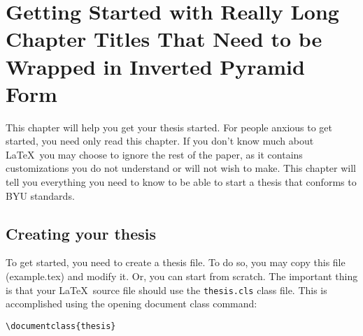 \documentclass[12pt]{thesis}
\begin{document}

% 

\tableofcontents
\listoftables
\listoffigures

\mainmatter

\chapter{Getting Started with Really Long Chapter Titles That Need to be Wrapped in Inverted Pyramid Form}
This chapter will help you get your thesis started. For people anxious to get started, you need only read this chapter. If you don't know much about \LaTeX\ you may choose to ignore the rest of the paper, as it contains customizations you do not understand or will not wish to make. This chapter will tell you everything you need to know to be able to start a thesis that conforms to BYU standards.

\section{Creating your thesis}
To get started, you need to create a thesis file. To do so, you may copy this file (example.tex) and modify it. Or, you can start from scratch. The important thing is that your \LaTeX\ source file should use the \texttt{thesis.cls} class file. This is accomplished using the opening document class command:
\begin{verbatim}
\documentclass{thesis}
\end{verbatim}
\end{document}
